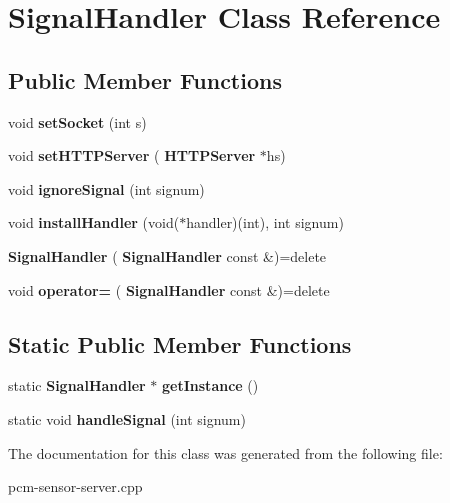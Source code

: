 \section{Signal\+Handler Class Reference}
\label{classSignalHandler}
\subsection*{Public Member Functions}
\begin{DoxyCompactItemize}
\item 
\mbox{\label{classSignalHandler_ac02cc0b10534e2008e3323839608d07c}} 
void {\bfseries set\+Socket} (int s)
\item 
\mbox{\label{classSignalHandler_ab2be035728faab346d8b40f94064d4cd}} 
void {\bfseries set\+H\+T\+T\+P\+Server} (\textbf{ H\+T\+T\+P\+Server} $\ast$hs)
\item 
\mbox{\label{classSignalHandler_af6b43bead661319978084b564d00e22c}} 
void {\bfseries ignore\+Signal} (int signum)
\item 
\mbox{\label{classSignalHandler_a34528d3e43f7f3cc86437fd929e1e26a}} 
void {\bfseries install\+Handler} (void($\ast$handler)(int), int signum)
\item 
\mbox{\label{classSignalHandler_a2ff98b300ecc83d2c27ee8bad5607034}} 
{\bfseries Signal\+Handler} (\textbf{ Signal\+Handler} const \&)=delete
\item 
\mbox{\label{classSignalHandler_a61b981ddb694f2cb233ae85f52b15d88}} 
void {\bfseries operator=} (\textbf{ Signal\+Handler} const \&)=delete
\end{DoxyCompactItemize}
\subsection*{Static Public Member Functions}
\begin{DoxyCompactItemize}
\item 
\mbox{\label{classSignalHandler_ada680c35500fece8bf2d7abadede1d28}} 
static \textbf{ Signal\+Handler} $\ast$ {\bfseries get\+Instance} ()
\item 
\mbox{\label{classSignalHandler_a0899d0c83b42582e862d2f4879e6a2e7}} 
static void {\bfseries handle\+Signal} (int signum)
\end{DoxyCompactItemize}


The documentation for this class was generated from the following file\+:\begin{DoxyCompactItemize}
\item 
pcm-\/sensor-\/server.\+cpp\end{DoxyCompactItemize}
